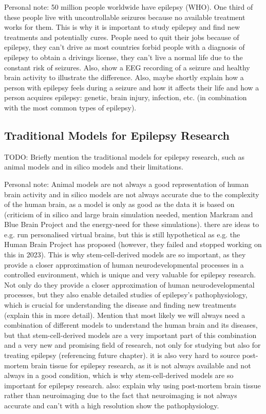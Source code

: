 \documentclass[10pt]{article}
\begin{document}
\begin{sloppypar}
  Personal note: 50 million people worldwide have epilepsy (WHO). One third of these people live with uncontrollable seizures because no available treatment works for them. This is why it is important to study epilepsy and find new treatments and potentially cures. People need to quit their jobs because of epilepsy, they can't drive as most countries forbid people with a diagnosis of epilepsy to obtain a drivings license, they can't live a normal life due to the constant risk of seizures. Also, show a EEG recording of a seizure and healthy brain activity to illustrate the difference. Also, maybe shortly explain how a person with epilepsy feels during a seizure and how it affects their life and how a person acquires epilepsy: genetic, brain injury, infection, etc. (in combination with the most common types of epilepsy).

  \subsection{Traditional Models for Epilepsy Research}
  \label{sec:traditional-models-for-epilepsy-research}
  TODO: Briefly mention the traditional models for epilepsy research, such as animal models and in silico models and their limitations.

  Personal note: Animal models are not always a good representation of human brain activity and in silico models are not always accurate due to the complexity of the human brain, as a model is only as good as the data it is based on (criticism of in silico and large brain simulation needed, mention Markram and Blue Brain Project and the energy-need for these simulations). there are ideas to e.g. run personalised virtual brains, but this is still hypothetical as e.g. the Human Brain Project has proposed (however, they failed and stopped working on this in 2023). This is why stem-cell-derived models are so important, as they provide a closer approximation of human neurodevelopmental processes in a controlled environment, which is unique and very valuable for epilepsy research. Not only do they provide a closer approximation of human neurodevelopmental processes, but they also enable detailed studies of epilepsy's pathophysiology, which is crucial for understanding the disease and finding new treatments (explain this in more detail). Mention that most likely we will always need a combination of different models to understand the human brain and its diseases, but that stem-cell-derived models are a very important part of this combination and a very new and promising field of research, not only for studying but also for treating epilepsy (referencing future chapter). it is also very hard to source post-mortem brain tissue for epilepsy research, as it is not always available and not always in a good condition, which is why stem-cell-derived models are so important for epilepsy research. also: explain why using post-mortem brain tissue rather than neuroimaging due to the fact that neuroimaging is not always accurate and can't with a high resolution show the pathophysiology.


\end{sloppypar}
\end{document}
